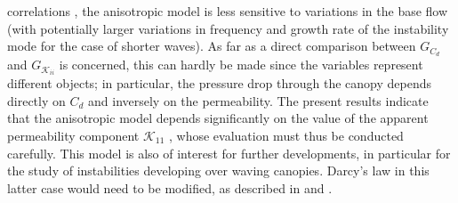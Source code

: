 correlations \citet{raupach1996coherent} \citet{zampogna2016instability}, the anisotropic model is less sensitive to variations in the base flow (with potentially
larger variations in frequency and growth rate of the instability mode for the case of shorter waves).
As far as a direct comparison between $G_{C_d}$ and $G_{\mathcal{K}_{ii}}$ is concerned, this can hardly be made since
the variables represent different objects; in particular, the pressure drop through the canopy depends
directly on $C_d$ and inversely on the permeability. The present results indicate that the anisotropic
model depends significantly on the value of the apparent \citet{zampogna2016fluid} permeability component $\mathcal{K}_{11}$ , whose
evaluation must thus be conducted carefully. This model is also of interest for further developments,
in particular for the study of instabilities developing over waving canopies. Darcy’s law in this latter
case would need to be modified, as described in \citet{mei2010homogenization} and \citet{zampognaMech}.





